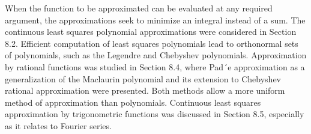 \documentclass[12pt]{article}
\theoremstyle{theorem}
\begin{document}
When the function to be approximated can be evaluated at any required argument,
the approximations seek to minimize an integral instead of a sum. The continuous least
squares polynomial approximations were considered in Section 8.2. Efficient computation
of least squares polynomials lead to orthonormal sets of polynomials, such as the Legendre
and Chebyshev polynomials. Approximation by rational functions was studied in Section
8.4, where Pad´e approximation as a generalization of the Maclaurin polynomial and its extension
to Chebyshev rational approximation were presented. Both methods allow a more
uniform method of approximation than polynomials. Continuous least squares approximation
by trigonometric functions was discussed in Section 8.5, especially as it relates to
Fourier series.

\newpage

\nocite{*}

 
\end{document}
